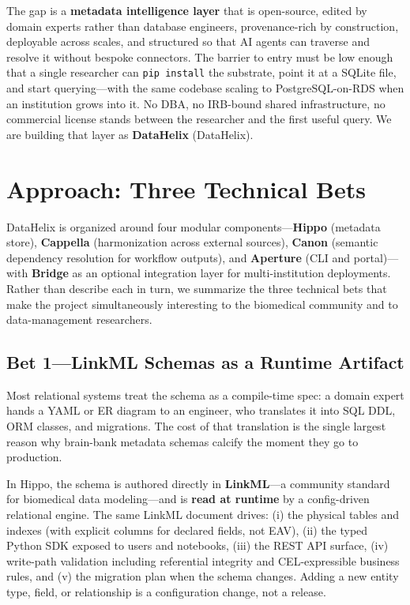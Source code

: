 \documentclass[sigconf, nonacm]{acmart}
\begin{document}
The gap is a \textbf{metadata intelligence layer} that is open-source, edited by domain experts rather than database engineers, provenance-rich by construction, deployable across scales, and structured so that AI agents can traverse and resolve it without bespoke connectors. The barrier to entry must be low enough that a single researcher can \texttt{pip install} the substrate, point it at a SQLite file, and start querying---with the same codebase scaling to PostgreSQL-on-RDS when an institution grows into it. No DBA, no IRB-bound shared infrastructure, no commercial license stands between the researcher and the first useful query. We are building that layer as \textbf{DataHelix} (DataHelix).

\section{Approach: Three Technical Bets}

DataHelix is organized around four modular components---\textbf{Hippo} (metadata store), \textbf{Cappella} (harmonization across external sources), \textbf{Canon} (semantic dependency resolution for workflow outputs), and \textbf{Aperture} (CLI and portal)---with \textbf{Bridge} as an optional integration layer for multi-institution deployments. Rather than describe each in turn, we summarize the three technical bets that make the project simultaneously interesting to the biomedical community and to data-management researchers.

\subsection{Bet 1---LinkML Schemas as a Runtime Artifact}

Most relational systems treat the schema as a compile-time spec: a domain expert hands a YAML or ER diagram to an engineer, who translates it into SQL DDL, ORM classes, and migrations. The cost of that translation is the single largest reason why brain-bank metadata schemas calcify the moment they go to production.

In Hippo, the schema is authored directly in \textbf{LinkML}---a community standard for biomedical data modeling---and is \textbf{read at runtime} by a config-driven relational engine. The same LinkML document drives: (i) the physical tables and indexes (with explicit columns for declared fields, not EAV), (ii) the typed Python SDK exposed to users and notebooks, (iii) the REST API surface, (iv) write-path validation including referential integrity and CEL-expressible business rules, and (v) the migration plan when the schema changes. Adding a new entity type, field, or relationship is a configuration change, not a release.
\end{document}
